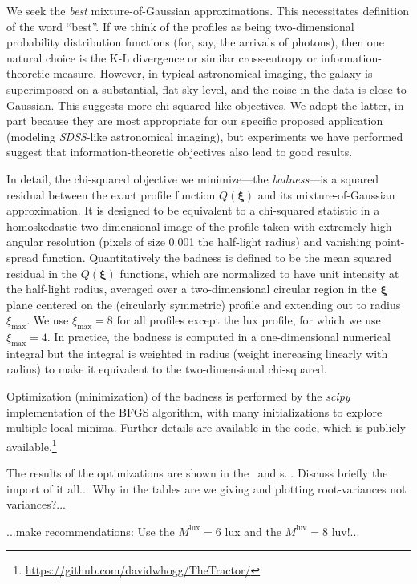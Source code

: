 \documentclass[12pt,pdftex,preprint]{aastex}
\newcommand{\project}[1]{\textsl{#1}}
\newcommand{\sdss}{\project{SDSS}}
\newcommand{\tvector}[1]{\boldsymbol{#1}}
\newcommand{\spos}{\tvector{\xi}}
\newcommand{\lux}{\mathrm{lux}}
\newcommand{\luv}{\mathrm{luv}}
\begin{document}
We seek the \emph{best} mixture-of-Gaussian approximations.  This
necessitates definition of the word ``best''.  If we think of the
profiles as being two-dimensional probability distribution functions
(for, say, the arrivals of photons), then one natural choice is the
K-L divergence or similar cross-entropy or information-theoretic
measure.  However, in typical astronomical imaging, the galaxy is
superimposed on a substantial, flat sky level, and the noise in the
data is close to Gaussian.  This suggests more chi-squared-like
objectives.  We adopt the latter, in part because they are most
appropriate for our specific proposed application (modeling \sdss-like
astronomical imaging), but experiments we have performed suggest that
information-theoretic objectives also lead to good results.

In detail, the chi-squared objective we minimize---the
\emph{badness}---is a squared residual between the exact profile
function $Q(\spos)$ and its mixture-of-Gaussian approximation.  It is
designed to be equivalent to a chi-squared statistic in a
homoskedastic two-dimensional image of the profile taken with
extremely high angular resolution (pixels of size 0.001 the half-light
radius) and vanishing point-spread function.  Quantitatively the
badness is defined to be the mean squared residual in the $Q(\spos)$
functions, which are normalized to have unit intensity at the
half-light radius, averaged over a two-dimensional circular region in
the $\spos$ plane centered on the (circularly symmetric) profile and
extending out to radius $\xi_{\max}$.  We use $\xi_{\max}=8$ for all
profiles except the $\lux$ profile, for which we use $\xi_{\max}=4$.
In practice, the badness is computed in a one-dimensional numerical
integral but the integral is weighted in radius (weight increasing
linearly with radius) to make it equivalent to the two-dimensional
chi-squared.

Optimization (minimization) of the badness is performed by the
\project{scipy} implementation of the BFGS algorithm, with many
initializations to explore multiple local minima.  Further details are
available in the code, which is publicly
available.\footnote{\url{https://github.com/davidwhogg/TheTractor/}}

The results of the optimizations are shown in the \tablename\ and
\figurename s... Discuss briefly the import of it all... Why in the
tables are we giving and plotting root-variances not variances?...

...make recommendations: Use the $M^{\lux}=6$ lux and the $M^{\luv}=8$
luv!...
\end{document}
